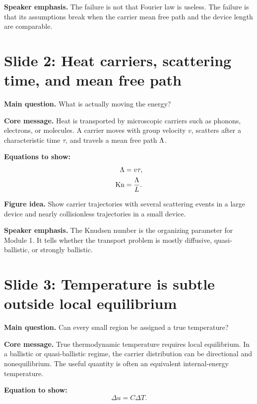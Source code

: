 \documentclass[11pt]{article}
\begin{document}
\textbf{Speaker emphasis.} The failure is not that Fourier law is useless. The failure is that its assumptions break when the carrier mean free path and the device length are comparable.

\section{Slide 2: Heat carriers, scattering time, and mean free path}
\begin{physicsbox}
\textbf{Main question.} What is actually moving the energy?
\end{physicsbox}

\textbf{Core message.} Heat is transported by microscopic carriers such as phonons, electrons, or molecules. A carrier moves with group velocity \(v\), scatters after a characteristic time \(\tau\), and travels a mean free path \(\Lambda\).

\textbf{Equations to show:}
\begin{align*}
\Lambda &= v\tau,\\
\mathrm{Kn} &= \frac{\Lambda}{L}.
\end{align*}

\textbf{Figure idea.} Show carrier trajectories with several scattering events in a large device and nearly collisionless trajectories in a small device.

\textbf{Speaker emphasis.} The Knudsen number is the organizing parameter for Module 1. It tells whether the transport problem is mostly diffusive, quasi-ballistic, or strongly ballistic.

\section{Slide 3: Temperature is subtle outside local equilibrium}
\begin{physicsbox}
\textbf{Main question.} Can every small region be assigned a true temperature?
\end{physicsbox}

\textbf{Core message.} True thermodynamic temperature requires local equilibrium. In a ballistic or quasi-ballistic regime, the carrier distribution can be directional and nonequilibrium. The useful quantity is often an equivalent internal-energy temperature.

\textbf{Equation to show:}
\begin{equation*}
\Delta u=C\Delta T.
\end{equation*}
\end{document}
